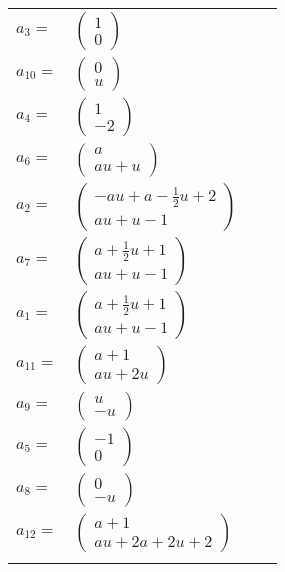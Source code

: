 \documentclass[1p]{elsarticle_modified}
\theoremstyle{definition}
\begin{document}
\begin{tabular}{m{7pt} m{180pt} m{7pt} m{180pt} }
\flushright $a_{3}=$&$\begin{pmatrix}1\\0\end{pmatrix}$ \\
\flushright $a_{10}=$&$\begin{pmatrix}0\\u\end{pmatrix}$ \\
\flushright $a_{4}=$&$\begin{pmatrix}1\\-2\end{pmatrix}$ \\
\flushright $a_{6}=$&$\begin{pmatrix}a\\a u+u\end{pmatrix}$ \\
\flushright $a_{2}=$&$\begin{pmatrix}- a u+a-\frac{1}{2} u+2\\a u+u-1\end{pmatrix}$ \\
\flushright $a_{7}=$&$\begin{pmatrix}a+\frac{1}{2} u+1\\a u+u-1\end{pmatrix}$ \\
\flushright $a_{1}=$&$\begin{pmatrix}a+\frac{1}{2} u+1\\a u+u-1\end{pmatrix}$ \\
\flushright $a_{11}=$&$\begin{pmatrix}a+1\\a u+2 u\end{pmatrix}$ \\
\flushright $a_{9}=$&$\begin{pmatrix}u\\- u\end{pmatrix}$ \\
\flushright $a_{5}=$&$\begin{pmatrix}-1\\0\end{pmatrix}$ \\
\flushright $a_{8}=$&$\begin{pmatrix}0\\- u\end{pmatrix}$ \\
\flushright $a_{12}=$&$\begin{pmatrix}a+1\\a u+2 a+2 u+2\end{pmatrix}$\\&\end{tabular}
\end{document}
